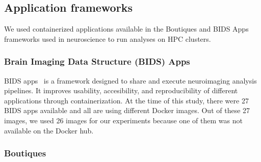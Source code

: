\documentclass[a4paper,num-refs]{oup-contemporary}
\begin{document}

\subsection{Application frameworks}

We used containerized applications available in the Boutiques and BIDS Apps
frameworks used in neuroscience to run analyses on HPC clusters. 

\subsubsection{Brain Imaging Data Structure (BIDS) Apps}

BIDS apps~\cite{gorgolewski2017bids} is a framework designed to share and execute neuroimaging
analysis pipelines. It improves usability, accesibility, and reproducibility
of different applications through containerization.
At the time of this study, there were 27 BIDS apps available and all are using different Docker images.
Out of these 27 images, we used 26 images for our experiments because one of them was not available
on the Docker hub.

\subsubsection{Boutiques}
\end{document}
